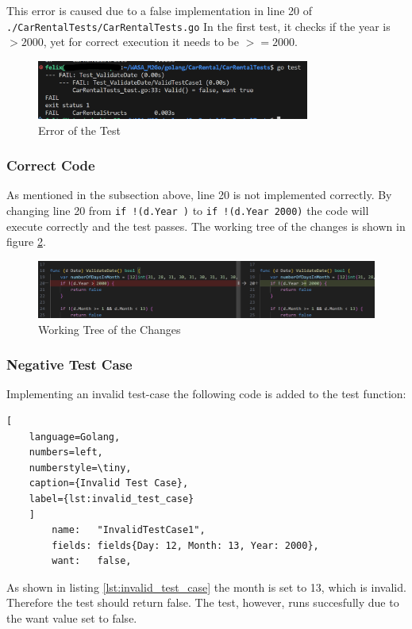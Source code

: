 This error is caused due to a false implementation in line 20 of \texttt{./CarRentalTests/CarRentalTests.go}
In the first test, it checks if the year is $>2000$, yet for correct execution it needs to be $>=2000$.

\begin{figure}[H]
    \centering
    \includegraphics[width=0.8\textwidth]{figures/goLang/carRental/carRental_dateTestError.png}
    \caption{Error of the Test}
    \label{fig:car_rental_test_error}
\end{figure}

\subsubsection*{Correct Code}
As mentioned in the subsection above, line 20 is not implemented correctly.
By changing line 20 from \texttt{if !(d.Year )} to \texttt{if !(d.Year \>\= 2000)} the code will execute correctly and the test passes.
The working tree of the changes is shown in figure \ref{fig:car_rental_test_working_tree}.

\begin{figure}[H]
    \centering
    \includegraphics[width=\textwidth]{figures/goLang/carRental/carRental_dateTestWorkingTree.png}
    \caption{Working Tree of the Changes}
    \label{fig:car_rental_test_working_tree}
\end{figure}

\subsubsection*{Negative Test Case}
Implementing an invalid test-case the following code is added to the test function:
\begin{lstlisting}[
    language=Golang,
    numbers=left,
    numberstyle=\tiny,
    caption={Invalid Test Case},
    label={lst:invalid_test_case}
    ]
	    name:   "InvalidTestCase1",
        fields: fields{Day: 12, Month: 13, Year: 2000},
	    want:   false,  
\end{lstlisting}

As shown in listing \ref{lst:invalid_test_case} the month is set to 13, which is invalid.
Therefore the test should return false.
The test, however, runs succesfully due to the want value set to false.
